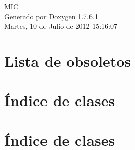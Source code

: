 \documentclass[a4paper]{book}
\begin{document}
\hypersetup{pageanchor=false,citecolor=blue}
\begin{titlepage}
\vspace*{7cm}
\begin{center}
{\Large \-M\-I\-C }\\
\vspace*{1cm}
{\large \-Generado por Doxygen 1.7.6.1}\\
\vspace*{0.5cm}
{\small Martes, 10 de Julio de 2012 15:16:07}\\
\end{center}
\end{titlepage}
\clearemptydoublepage
{}
\tableofcontents
\clearemptydoublepage
{}
\hypersetup{pageanchor=true,citecolor=blue}
\chapter{\-Lista de obsoletos}
\label{deprecated}
\hypertarget{deprecated}{}

\chapter{Índice de clases}

\chapter{Índice de clases}

\end{document}

